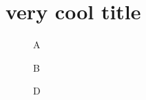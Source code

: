 \documentclass{article}
\begin{document}
\section{very cool title}
\begin{figure}[H]  \caption{A} \end{figure}
\begin{figure}[H]  \caption{B} \end{figure}
\begin{figure}[H]  \caption{D} \end{figure}
\begin{figure}[H]  \end{figure}
\begin{figure}[H]  \end{figure}
\end{document}
